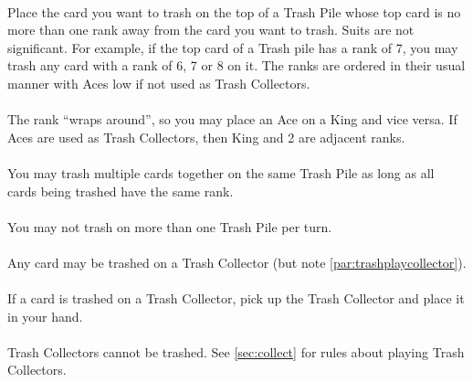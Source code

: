 \documentclass{article}
\begin{document}
\paragraph{\label{par:trashvalid}}
Place the card you want to trash on the top of a Trash Pile whose top card is no more than one rank away from the card you want to trash. Suits are not significant. For example, if the top card of a Trash pile has a rank of 7, you may trash any card with a rank of 6, 7 or 8 on it.
The ranks are ordered in their usual manner with Aces low if not used as Trash Collectors.

\paragraph{\label{par:trashwraparound}}
The rank ``wraps around'', so you may place an Ace on a King and vice versa. If Aces are used as Trash Collectors, then King and 2 are adjacent ranks.

\paragraph{\label{par:trashmultiple}}
You may trash multiple cards together on the same Trash Pile as long as all cards being trashed have the same rank.

\paragraph{\label{par:trashmultiplepiles}}
You may not trash on more than one Trash Pile per turn.

\paragraph{\label{par:trashwild}}
Any card may be trashed on a Trash Collector (but note \autoref{par:trashplaycollector}).

\paragraph{\label{par:trashplayoncollector}}
If a card is trashed on a Trash Collector, pick up the Trash Collector and place it in your hand.

\paragraph{\label{par:trashplaycollector}}
Trash Collectors cannot be trashed. See \autoref{sec:collect} for rules about playing Trash Collectors.
\end{document}
